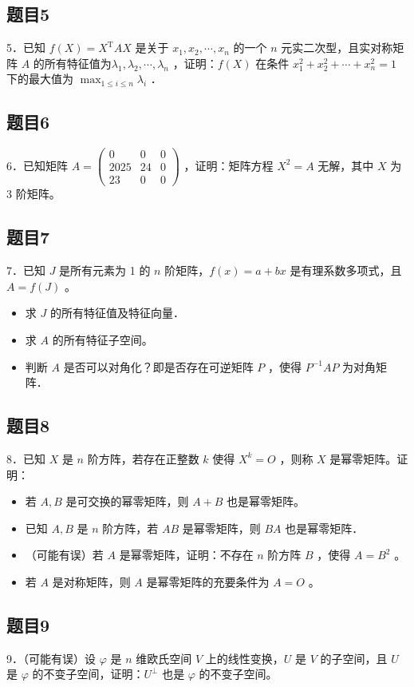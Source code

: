 \documentclass{article}
\begin{document}
\subsection{题目5}
5．已知 \(f(X)=X^{\mathrm{T}} A X\) 是关于 \(x_{1}, x_{2}, \cdots, x_{n}\) 的一个 \(n\) 元实二次型，且实对称矩阵 \(A\) 的所有特征值为\(\lambda_{1}, \lambda_{2}, \cdots, \lambda_{n}\) ，证明：\(f(X)\) 在条件 \(x_{1}^{2}+x_{2}^{2}+\cdots+x_{n}^{2}=1\) 下的最大值为 \(\max _{1 \leq i \leq n} \lambda_{i}\) ．

\subsection{题目6}
6．已知矩阵 \(A=\left(\begin{array}{ccc}0 & 0 & 0 \\ 2025 & 24 & 0 \\ 23 & 0 & 0\end{array}\right)\) ，证明：矩阵方程 \(X^{2}=A\) 无解，其中 \(X\) 为 3 阶矩阵。

\subsection{题目7}
7．已知 \(J\) 是所有元素为 1 的 \(n\) 阶矩阵，\(f(x)=a+b x\) 是有理系数多项式，且 \(A=f(J)\) 。

\begin{itemize}
  \item[（1）] 求 \(J\) 的所有特征值及特征向量．
  \item[（2）] 求 \(A\) 的所有特征子空间。
  \item[（3）] 判断 \(A\) 是否可以对角化？即是否存在可逆矩阵 \(P\) ，使得 \(P^{-1} A P\) 为对角矩阵．
\end{itemize}

\subsection{题目8}
8．已知 \(X\) 是 \(n\) 阶方阵，若存在正整数 \(k\) 使得 \(X^{k}=O\) ，则称 \(X\) 是幂零矩阵。证明：

\begin{itemize}
  \item[（1）] 若 \(A, B\) 是可交换的幂零矩阵，则 \(A+B\) 也是幂零矩阵。
  \item[（2）] 已知 \(A, B\) 是 \(n\) 阶方阵，若 \(A B\) 是幂零矩阵，则 \(B A\) 也是幂零矩阵．
  \item[（3）] （可能有误）若 \(A\) 是幂零矩阵，证明：不存在 \(n\) 阶方阵 \(B\) ，使得 \(A=B^{2}\) 。
  \item[（4）] 若 \(A\) 是对称矩阵，则 \(A\) 是幂零矩阵的充要条件为 \(A=O\) 。
\end{itemize}

\subsection{题目9}
9．（可能有误）设 \(\varphi\) 是 \(n\) 维欧氏空间 \(V\) 上的线性变换，\(U\) 是 \(V\) 的子空间，且 \(U\) 是 \(\varphi\) 的不变子空间，证明：\(U^{\perp}\) 也是 \(\varphi\) 的不变子空间。
\end{document}
